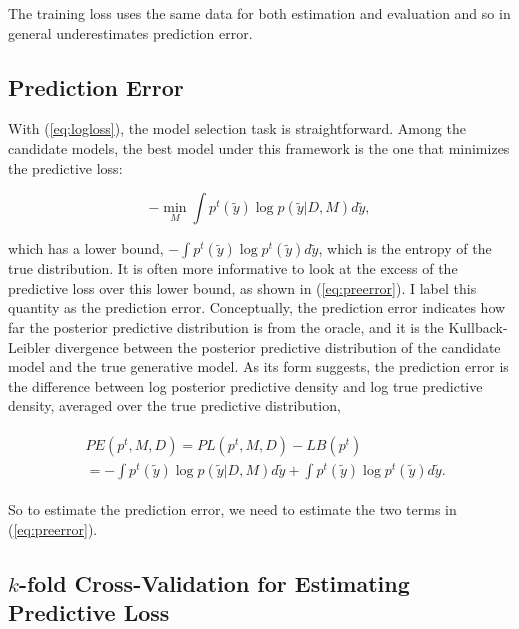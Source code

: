 \documentclass[11pt,article,oneside]{memoir}
\begin{document}
The training loss uses the same data for both estimation and evaluation
and so in general underestimates prediction error.

\subsection{Prediction Error}\label{prediction-error}

With (\ref{eq:logloss}), the model selection task is straightforward.
Among the candidate models, the best model under this framework is the
one that minimizes the predictive loss:

\begin{equation}
  \label{eq:minimizer}
  - \min_{M} \int \!p^t(\tilde y) \log p(\tilde y|D, M) d\tilde y,
  \end{equation}

which has a lower bound,
\(-\!\int\! p^t(\tilde y) \log p^t(\tilde y) d\tilde y\), which is the
entropy of the true distribution. It is often more informative to look
at the excess of the predictive loss over this lower bound, as shown in
(\ref{eq:preerror}). I label this quantity as the prediction error.
Conceptually, the prediction error indicates how far the posterior
predictive distribution is from the oracle, and it is the
Kullback-Leibler divergence between the posterior predictive
distribution of the candidate model and the true generative model. As
its form suggests, the prediction error is the difference between log
posterior predictive density and log true predictive density, averaged
over the true predictive distribution,

\begin{align}
\begin{split}
  \label{eq:preerror}
    &PE(p^t, M, D)= PL(p^t, M, D) - LB(p^t) \\  
               &=-\int p^t(\tilde y) \log p(\tilde y|D, M) d\tilde y+\int
               p^t(\tilde y) \log p^t(\tilde y) d\tilde y.
               \end{split}
\end{align}

So to estimate the prediction error, we need to estimate the two terms
in (\ref{eq:preerror}).

\subsection{\texorpdfstring{\(k\)-fold Cross-Validation for Estimating
Predictive
Loss}{k-fold Cross-Validation for Estimating Predictive Loss}}\label{k-fold-cross-validation-for-estimating-predictive-loss}
\end{document}
